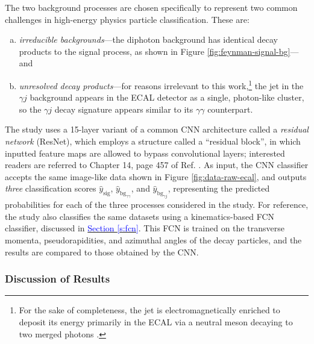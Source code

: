 \documentclass[11pt, a4paper]{article}
\newcommand{\myhref}[2]{\hyperref[#1]{\textcolor{blue}{#2}}}
\begin{document}
The two background processes are chosen specifically to represent two common challenges in high-energy physics particle classification. These are:
\begin{enumerate}[(a)]

    \item \textit{irreducible backgrounds}---the diphoton background has identical decay products to the signal process, as shown in Figure \ref{fig:feynman-signal-bg}---and %

    \item \textit{unresolved decay products}---for reasons irrelevant to this work,\footnote{For the sake of completeness, the jet is electromagnetically enriched to deposit its energy primarily in the ECAL via a neutral meson decaying to two merged photons \cite{andrews-higgs, data-bg-jet}.} the jet in the $ \gamma j $ background appears in the ECAL detector as a single, photon-like cluster, so the $ \gamma j $ decay signature appears similar to its $ \gamma \gamma $ counterpart.

\end{enumerate}
The study uses a 15-layer variant of a common CNN architecture called a \textit{residual network} (ResNet), which employs a structure called a ``residual block'', in which inputted feature maps are allowed to bypass convolutional layers; interested readers are referred to Chapter 14, page 457 of Ref. \cite{homl}. As input, the CNN classifier accepts the same image-like data shown in Figure \ref{fig:data-raw-ecal}, and outputs \textit{three} classification scores $ \hat{y}_{\text{sig}} $, $ \hat{y}_{\text{bg}_{\gamma\gamma}} $, and $ \hat{y}_{\text{bg}_{\gamma j}} $, representing the predicted probabilities for each of the three processes considered in the study. For reference, the study also classifies the same datasets using a kinematics-based FCN classifier, discussed in \myhref{s:fcn}{Section \ref{s:fcn}}. This FCN is trained on the transverse momenta, pseudorapidities, and azimuthal angles of the decay particles, and the results are compared to those obtained by the CNN. 

\subsubsection{Discussion of Results}
\end{document}
